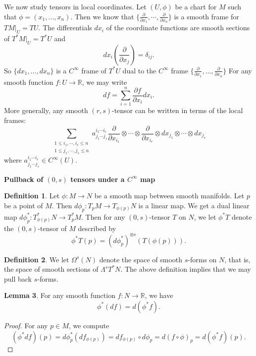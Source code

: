 \documentclass{amsart}
\numberwithin{equation}{section}
\theoremstyle{definition}
\newtheorem{definition}{Definition} [section]
\theoremstyle{theorem}
\newtheorem{lemma}[definition]{Lemma}
\begin{document}
We now study tensors in local coordinates. Let $(U,\phi)$ be a chart for $M$ such that $\phi = (x_1, \ldots, x_n)$. Then we know that $\{\frac{\partial }{\partial x_1},\cdots,\frac{\partial}{\partial x_n}\}$ is a smooth frame for $TM|_U = TU$. The differentials $dx_i$ of the coordinate functions are smooth
sections of $T^*M|_U =T^*U$ and 
$$
dx_i(\frac{\partial}{\partial x_j}) =\delta_{ij}.
$$
So $\{ dx_1,\ldots, dx_n\}$ is a $C^\infty$ frame of $T^*U$ dual 
to the $C^\infty$ frame $\{\frac{\partial}{\partial x_1},\ldots, 
\frac{\partial}{\partial x_n}\}$
For any smooth function $f : U \to \mathbb{R}$, we may write 
\[
df = \sum_{i=1}^n \frac{\partial f}{\partial x_i} dx_i.
\] 
More generally, any smooth $(r,s)$-tensor can be written in terms of the local frames:
\[
\sum_{\substack{1 \le i_1, \cdots, i_r \le n \\ 1 \le j_1, \cdots,  j_s \le n}} a^{i_1 \cdots i_r}_{j_1 \cdots j_s} \frac{\partial }{\partial x_{i_1}} \otimes \cdots \otimes \frac{\partial }{\partial x_{i_r}} \otimes dx_{j_1} \otimes \cdots \otimes dx_{j_s}
\]
where $a^{i_1 \cdots i_r}_{j_1 \cdots j_s} \in C^\infty(U)$. 

\bigskip

\noindent
{\bf \large Pullback of $(0,s)$ tensors under a $C^\infty$ map}
\begin{definition}
Let $\phi : M \to N$ be a smooth map between smooth manifolds. Let $p$ be a point of $M$. Then $d\phi_p : T_pM \to T_{\phi(p)}N$ is a linear map. We get a dual linear map $d\phi_p^* : T_{\phi(p)}^*N \to T_p^*M$. Then for any $(0,s)$-tensor $T$ on $N$, we let $\phi^*T$ denote the $(0,s)$-tensor of $M$ described by 
\[
\phi^*T(p) = (d\phi_p^*)^{\otimes s}(T(\phi(p))). 
\]
\end{definition}

\begin{definition}
We let $\Omega^s(N)$ denote the space of smooth $s$-forms on $N$, that is, the space of smooth sections of $\Lambda^sT^*N$. The above definition implies that we may pull back $s$-forms. 
\end{definition}

\begin{lemma}
For any smooth function $f: N \to \mathbb{R}$, we have 
\[
\phi^*(df) = d(\phi^*f).
\]
\end{lemma}

\begin{proof}
For any $p \in M$, we compute 
\[
(\phi^*df)(p) = d\phi_p^*(df_{\phi(p)}) = df_{\phi(p)} \circ d\phi_p = d(f \circ \phi)_p = d(\phi^*f)(p). 
\]
\end{proof}
\end{document}
